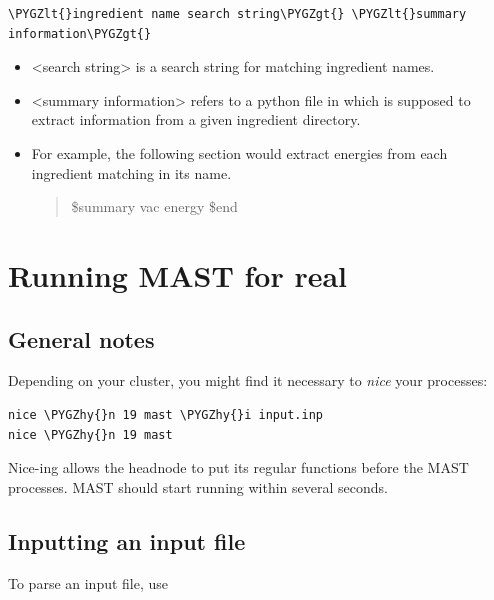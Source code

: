 \documentclass[letterpaper,10pt,english]{sphinxmanual}
\def\PYGZlt{\char`\<}
\def\PYGZgt{\char`\>}
\def\PYGZhy{\char`\-}
\begin{document}
\begin{Verbatim}[commandchars=\\\{\}]
\PYGZlt{}ingredient name search string\PYGZgt{} \PYGZlt{}summary information\PYGZgt{}
\end{Verbatim}
\begin{itemize}
\item {} 
\textless{}search string\textgreater{} is a search string for matching ingredient names.

\item {} 
\textless{}summary information\textgreater{} refers to a python file in  which is supposed to extract information from a given ingredient directory.

\item {} 
For example, the following section would extract energies from each ingredient matching  in its name.
\begin{quote}

\$summary
vac energy
\$end
\end{quote}

\end{itemize}


\chapter{Running MAST for real}
\label{5_0_runningmast:running-mast-for-real}\label{5_0_runningmast::doc}

\section{General notes}
\label{5_0_runningmast:general-notes}
Depending on your cluster, you might find it necessary to \emph{nice} your processes:

\begin{Verbatim}[commandchars=\\\{\}]
nice \PYGZhy{}n 19 mast \PYGZhy{}i input.inp
nice \PYGZhy{}n 19 mast
\end{Verbatim}

Nice-ing allows the headnode to put its regular functions before the MAST processes. MAST should start running within several seconds.


\section{Inputting an input file}
\label{5_0_runningmast:inputting-an-input-file}
To parse an input file, use
\end{document}
